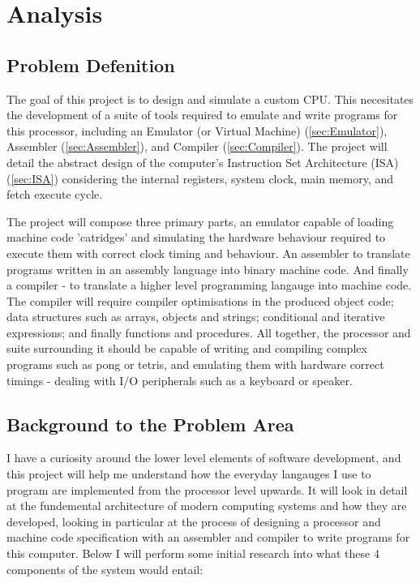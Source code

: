 \section{Analysis}
\subsection{Problem Defenition}
The goal of this project is to design and simulate a custom CPU. This necesitates the development of a suite of tools required to emulate and write programs for this processor, including an Emulator (or Virtual Machine) (\ref{sec:Emulator}), Assembler (\ref{sec:Assembler}), and Compiler (\ref{sec:Compiler}). The project will detail the abstract design of the computer’s Instruction Set Architecture (ISA) (\ref{sec:ISA}) considering the internal registers, system clock, main memory, and fetch execute cycle.

The project will compose three primary parts, an emulator capable of loading machine code 'catridges' and simulating the hardware behaviour required to execute them with correct clock timing and behaviour. An assembler to translate programs written in an assembly language into binary machine code. And finally a compiler - to translate a higher level programming langauge into machine code. The compiler will require compiler optimisations in the produced object code; data structures such as arrays, objects and strings; conditional and iterative expressions; and finally functions and procedures. All together, the processor and suite surrounding it should be capable of writing and compiling complex programs such as pong or tetris, and emulating them with hardware correct timings - dealing with I/O peripherals such as a keyboard or speaker.

\subsection{Background to the Problem Area}
I have a curiosity around the lower level elements of software development, and this project will help me understand how the everyday langauges I use to program are implemented from the processor level upwards. It will look in detail at the fundemental architecture of modern computing systems and how they are developed, looking in particular at the process of designing a processor and machine code specification with an assembler and compiler to write programs for this computer. Below I will perform some initial research into what these 4 components of the system would entail:

